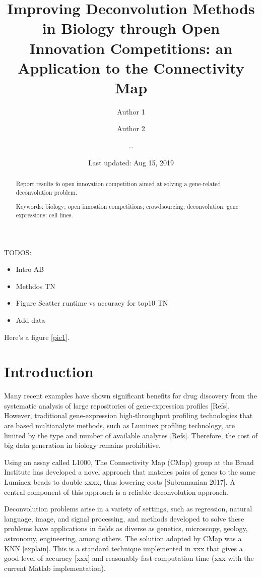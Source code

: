 \documentclass[]{article}
\title{Improving Deconvolution Methods in Biology through Open Innovation
Competitions: an Application to the Connectivity Map}
\author{Author 1 \and Author 2 \and \ldots{}}
\date{Last updated: Aug 15, 2019}
\providecommand{\tightlist}{%
  \setlength{\itemsep}{0pt}\setlength{\parskip}{0pt}}
\begin{document}
\maketitle
\begin{abstract}
Report results fo open innovation competition aimed at solving a
gene-related deconvolution problem.


\smallskip\noindent 
Keywords: biology; open innoation competitions; crowdsourcing; deconvolution; gene expressions; cell lines.
\end{abstract}

{
\setcounter{tocdepth}{2}
\newpage
\tableofcontents
\newpage
}
TODOS:

\begin{itemize}
\tightlist
\item
  Intro AB
\item
  Methdos TN
\item
  Figure Scatter runtime vs accuracy for top10 TN
\item
  Add data
\end{itemize}

Here's a figure \ref{pic1}.

\hypertarget{introduction}{%
\section{Introduction}\label{introduction}}

Many recent examples have shown significant benefits for drug discovery
from the systematic analysis of large repositories of gene-expression
profiles {[}Refs{]}. However, traditional gene-expression
high-throughput profiling technologies that are based multianalyte
methods, such as Luminex profiling technology, are limited by the type
and number of available analytes {[}Refs{]}. Therefore, the cost of big
data generation in biology remains prohibitive.

Using an assay called L1000, The Connectivity Map (CMap) group at the
Broad Institute has developed a novel approach that matches pairs of
genes to the same Luminex beads to double xxxx, thus lowering costs
{[}Subramanian 2017{]}. A central component of this approach is a
reliable deconvolution approach.

Deconvolution problems arise in a variety of settings, such as
regression, natural language, image, and signal processing, and methods
developed to solve these problems have applications in fields as diverse
as genetics, microscopy, geology, astronomy, engineering, among others.
The solution adopted by CMap was a KNN {[}explain{]}. This is a standard
technique implemented in xxx that gives a good level of accuracy
{[}xxx{]} and reasonably fast computation time (xxx with the current
Matlab implementation).
\end{document}
